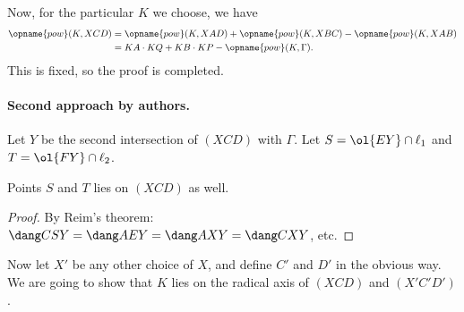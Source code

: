 Now, for the particular $K$ we choose, we have
\begin{align*}
  \opname{pow}(K, XCD) &=
  \opname{pow}(K, XAD) + \opname{pow}(K, XBC) - \opname{pow}(K, XAB) \\
  &= KA \cdot KQ + KB \cdot KP - \opname{pow}(K, \Gamma).
\end{align*}
This is fixed, so the proof is completed.

\paragraph{Second approach by authors.}
Let $Y$ be the second intersection of $(XCD)$ with $\Gamma$.
Let $S = \ol{EY} \cap \ell_1$ and $T = \ol{FY} \cap \ell_2$.
\begin{claim*}
  Points $S$ and $T$ lies on $(XCD)$ as well.
\end{claim*}
\begin{proof}
  By Reim's theorem: $\dang CSY = \dang AEY = \dang AXY = \dang CXY$, etc.
\end{proof}

Now let $X'$ be any other choice of $X$,
and define $C'$ and $D'$ in the obvious way.
We are going to show that $K$ lies on the radical axis
of $(XCD)$ and $(X'C'D')$.

